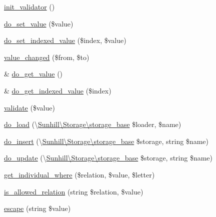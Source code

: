 \begin{DoxyCompactItemize}
\item 
\hyperlink{classSunhill_1_1Properties_1_1oo__property_a42774ca2b49ad8ecc60fdc8e3d4d6796}{init\+\_\+validator} ()
\item 
\hyperlink{classSunhill_1_1Properties_1_1oo__property_a1228935ef7bd26d8c99e2a6bd4acc84f}{do\+\_\+set\+\_\+value} (\$value)
\item 
\hyperlink{classSunhill_1_1Properties_1_1oo__property_ae5350dc2b12adf165055ddc5a711ea86}{do\+\_\+set\+\_\+indexed\+\_\+value} (\$index, \$value)
\item 
\hyperlink{classSunhill_1_1Properties_1_1oo__property_ab867e6db833545d835cb1280eec760bc}{value\+\_\+changed} (\$from, \$to)
\item 
\& \hyperlink{classSunhill_1_1Properties_1_1oo__property_a7a798dfd4cd03bd9b057a808e7f30a44}{do\+\_\+get\+\_\+value} ()
\item 
\& \hyperlink{classSunhill_1_1Properties_1_1oo__property_aece257c8d21496033781134eb40eb55c}{do\+\_\+get\+\_\+indexed\+\_\+value} (\$index)
\item 
\hyperlink{classSunhill_1_1Properties_1_1oo__property_a0b28ea2b83316460888cd440873d48a6}{validate} (\$value)
\item 
\hyperlink{classSunhill_1_1Properties_1_1oo__property_a26157a73cf79ff467160b5e521ff6b3a}{do\+\_\+load} (\textbackslash{}\hyperlink{classSunhill_1_1Storage_1_1storage__base}{Sunhill\textbackslash{}\+Storage\textbackslash{}storage\+\_\+base} \$loader, \$name)
\item 
\hyperlink{classSunhill_1_1Properties_1_1oo__property_a6cd8667a27eddd878198e5c09f61bba1}{do\+\_\+insert} (\textbackslash{}\hyperlink{classSunhill_1_1Storage_1_1storage__base}{Sunhill\textbackslash{}\+Storage\textbackslash{}storage\+\_\+base} \$storage, string \$name)
\item 
\hyperlink{classSunhill_1_1Properties_1_1oo__property_ab2b1ff3276bff0658b7ab097b2f01121}{do\+\_\+update} (\textbackslash{}\hyperlink{classSunhill_1_1Storage_1_1storage__base}{Sunhill\textbackslash{}\+Storage\textbackslash{}storage\+\_\+base} \$storage, string \$name)
\item 
\hyperlink{classSunhill_1_1Properties_1_1oo__property_a4d2f6cdf3cb90aa8da32be607c6292df}{get\+\_\+individual\+\_\+where} (\$relation, \$value, \$letter)
\item 
\hyperlink{classSunhill_1_1Properties_1_1oo__property_ae536a07b2d1286e90b9a4efac347f8d6}{is\+\_\+allowed\+\_\+relation} (string \$relation, \$value)
\item 
\hyperlink{classSunhill_1_1Properties_1_1oo__property_a65e7fd5eec8605a42556d46bbf9256be}{escape} (string \$value)
\end{DoxyCompactItemize}

